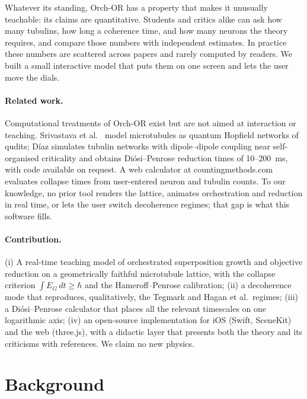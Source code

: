\documentclass[11pt]{article}
\begin{document}
Whatever its standing, Orch-OR has a property that makes it unusually teachable: its claims are quantitative. Students and critics alike can ask how many tubulins, how long a coherence time, and how many neurons the theory requires, and compare those numbers with independent estimates. In practice these numbers are scattered across papers and rarely computed by readers. We built a small interactive model that puts them on one screen and lets the user move the dials.


\paragraph{Related work.} Computational treatments of Orch-OR exist but are not aimed at interaction or teaching. Srivastava et al.\ \citep{srivastava2015} model microtubules as quantum Hopfield networks of qudits; D\'iaz \citep{diaz2025} simulates tubulin networks with dipole--dipole coupling near self-organised criticality and obtains Di\'osi--Penrose reduction times of 10--200~ms, with code available on request. A web calculator at countingmethods.com \citep{countingmethods} evaluates collapse times from user-entered neuron and tubulin counts. To our knowledge, no prior tool renders the lattice, animates orchestration and reduction in real time, or lets the user switch decoherence regimes; that gap is what this software fills.

\paragraph{Contribution.} (i) A real-time teaching model of orchestrated superposition growth and objective reduction on a geometrically faithful microtubule lattice, with the collapse criterion $\int E_G\,dt \ge \hbar$ and the Hameroff--Penrose calibration; (ii) a decoherence mode that reproduces, qualitatively, the Tegmark and Hagan et al.\ regimes; (iii) a Di\'osi--Penrose calculator that places all the relevant timescales on one logarithmic axis; (iv) an open-source implementation for iOS (Swift, SceneKit) and the web (three.js), with a didactic layer that presents both the theory and its criticisms with references. We claim no new physics.

\section{Background}
\end{document}
